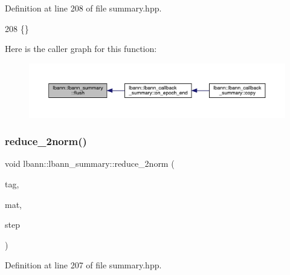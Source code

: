 Definition at line 208 of file summary.\+hpp.


\begin{DoxyCode}
208 \{\}
\end{DoxyCode}
Here is the caller graph for this function\+:\nopagebreak
\begin{figure}[H]
\begin{center}
\leavevmode
\includegraphics[width=350pt]{classlbann_1_1lbann__summary_afca72ec49f3e813b6563285a2153a5be_icgraph}
\end{center}
\end{figure}
\mbox{\label{classlbann_1_1lbann__summary_a336143c9540d779381658beb4e841b73}} 
\subsubsection{\texorpdfstring{reduce\+\_\+2norm()}{reduce\_2norm()}}
{\footnotesize\ttfamily void lbann\+::lbann\+\_\+summary\+::reduce\+\_\+2norm (\begin{DoxyParamCaption}\item[{const std\+::string}]{tag,  }\item[{const \hyperlink{base_8hpp_a9a697a504ae84010e7439ffec862b470}{Abs\+Dist\+Mat} \&}]{mat,  }\item[{int}]{step }\end{DoxyParamCaption})\hspace{0.3cm}{\ttfamily [inline]}}



Definition at line 207 of file summary.\+hpp.


